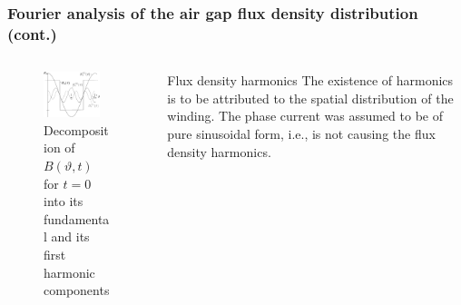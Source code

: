 \begin{frame}
	\frametitle{Fourier analysis of the air gap flux density distribution (cont.)}
    \begin{columns}
        \begin{column}{0.6\textwidth}
            \begin{figure}
            \centering
            \includegraphics[width=0.825\textwidth]{fig/lec05/B_single_phase_harmonics.pdf}
            \caption{Decomposition of $B(\vartheta, t)$ for $t=0$ into its fundamental and its first harmonic components}
            \label{fig:B_single_phase_harmonics}
        \end{figure}
        \end{column}
        \begin{column}{0.4\textwidth}
            \begin{varblock}{Flux density harmonics}
                The existence of harmonics is to be attributed to the spatial distribution of the winding. The phase current was assumed to be of pure sinusoidal form, i.e., is not causing the flux density harmonics.
            \end{varblock}
        \end{column}
    \end{columns}
\end{frame}

